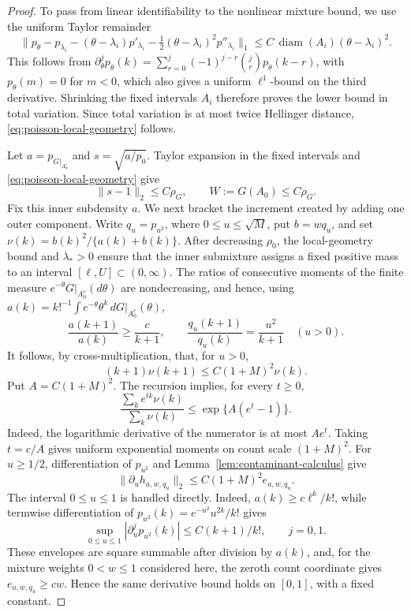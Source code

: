 \documentclass[11pt]{article}
\theoremstyle{definition}
\numberwithin{equation}{section}
\begin{document}
\begin{proof}
To pass from linear identifiability to the nonlinear mixture bound, we use
the uniform Taylor remainder
\[
 \|p_\theta-p_{\lambda_i}-(\theta-\lambda_i)p'_{\lambda_i}
       -\tfrac12(\theta-\lambda_i)^2p''_{\lambda_i}\|_1
 \le C\,\operatorname{diam}(A_i)(\theta-\lambda_i)^2.
\]
This follows from
\(\partial_\theta^jp_\theta(k)=\sum_{r=0}^j(-1)^{j-r}
\binom jr p_\theta(k-r)\), with \(p_\theta(m)=0\) for \(m<0\), which
also gives a uniform \(\ell^1\)-bound on the third derivative. Shrinking
the fixed intervals \(A_i\) therefore proves the lower bound in total
variation.
Since total variation is at most twice Hellinger distance,
\eqref{eq:poisson-local-geometry} follows.

Let \(a=p_{G|_{A_0^c}}\) and \(s=\sqrt{a/p_0}\). Taylor expansion in the
fixed intervals and \eqref{eq:poisson-local-geometry} give
\begin{equation}
\label{eq:poisson-inner-outer-size}
 \|s-1\|_2\le C\rho_G,
 \qquad W:=G(A_0)\le C\rho_G.
\end{equation}
Fix this inner subdensity \(a\). We next bracket the increment
created by adding one outer component. Write \(q_u=p_{u^2}\), where
\(0\le u\le\sqrt M\), put \(b=wq_u\), and set
\(\nu(k)=b(k)^2/\{a(k)+b(k)\}\). After decreasing \(\rho_0\), the
local-geometry bound and \(\lambda_*>0\) ensure that the inner submixture
assigns a fixed positive mass to an interval
\([\ell,U]\subset(0,\infty)\). The ratios of consecutive moments of the
finite measure \(e^{-\theta}G|_{A_0^c}(d\theta)\) are nondecreasing, and
hence, using
\(a(k)=k!^{-1}\int e^{-\theta}\theta^k\,dG|_{A_0^c}(\theta)\),
\[
 \frac{a(k+1)}{a(k)}\ge\frac{c}{k+1},
 \qquad
 \frac{q_u(k+1)}{q_u(k)}=\frac{u^2}{k+1}\quad(u>0).
\]
It follows, by cross-multiplication, that, for \(u>0\),
\[
 (k+1)\nu(k+1)\le C(1+M)^2\nu(k).
\]
Put \(A=C(1+M)^2\). The recursion implies, for every \(t\ge0\),
\[
 \frac{\sum_ke^{tk}\nu(k)}{\sum_k\nu(k)}
 \le \exp\{A(e^t-1)\}.
\]
Indeed, the logarithmic derivative of the numerator is at most \(Ae^t\).
Taking \(t=c/A\) gives uniform exponential moments on count scale
\((1+M)^2\). For \(u\ge1/2\), differentiation of
\(p_{u^2}\) and Lemma~\ref{lem:contaminant-calculus} give
\[
 \|\partial_u h_{a,w,q_u}\|_2
 \le C(1+M)^2e_{a,w,q_u}.
\]
The interval \(0\le u\le1\) is handled directly. Indeed,
\(a(k)\ge c\ell^k/k!\), while termwise differentiation of
\(p_{u^2}(k)=e^{-u^2}u^{2k}/k!\) gives
\[
 \sup_{0\le u\le1}|\partial_u^jp_{u^2}(k)|
 \le C(k+1)/k!,\qquad j=0,1.
\]
These envelopes are square summable after division by \(a(k)\), and, for
the mixture weights \(0<w\le1\) considered here, the zeroth count
coordinate gives \(e_{a,w,q_u}\ge cw\). Hence the same
derivative bound holds on \([0,1]\), with a fixed constant.


\end{proof}
\end{document}
